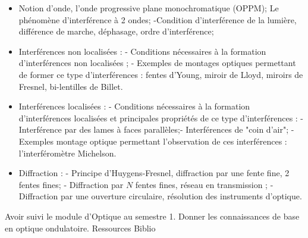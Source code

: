 \documentclass[10pt, a5paper]{report}
\begin{document}
\vfill


{
\begin{itemize}
\item
Notion d'onde, l'onde progressive plane monochromatique (OPPM);
Le phénomène d'interférence à 2 ondes; -Condition d'interférence de la lumière, différence de marche, déphasage, ordre d'interférence;
\item 
Interférences non localisées : - Conditions nécessaires à la formation d'interférences non localisées ; - Exemples de montages optiques permettant de former ce type d'interférences : fentes d'Young, miroir de Lloyd, miroirs de Fresnel, bi-lentilles de Billet.
\item
Interférences localisées : - Conditions nécessaires à la formation d'interférences localisées et principales propriétés de ce type d'interférences : - Interférence par des lames à faces parallèles;- Interférences de "coin d'air"; - Exemples montage optique permettant l'observation de ces interférences : l'interféromètre Michelson.
\item
Diffraction : - Principe d'Huygens-Fresnel, diffraction par une fente fine, 2 fentes fines; - Diffraction par $N$ fentes fines, réseau en transmission ; - Diffraction par une ouverture circulaire, résolution des instruments d'optique.
\end{itemize}
}
{Avoir suivi le module d'Optique au semestre 1.}
{Donner les connaissances de base en optique ondulatoire.}
{Ressources} 
{Biblio}
 
\vfill

\end{document}
